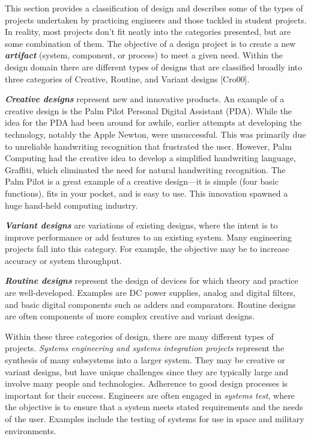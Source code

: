 This section provides a classification of design and describes some of
the types of projects undertaken by practicing engineers and those
tackled in student projects. In reality, most projects don't fit neatly
into the categories presented, but are some combination of them. The
objective of a design project is to create a new
\emph{\textbf{artifact}} (system, component, or process) to meet a given
need. Within the design domain there are different types of designs that
are classified broadly into three categories of Creative, Routine, and
Variant designs {[}Cro00{]}.

\emph{\textbf{Creative designs}} represent new and innovative products.
An example of a creative design is the Palm Pilot Personal Digital
Assistant (PDA). While the idea for the PDA had been around for awhile,
earlier attempts at developing the technology, notably the Apple Newton,
were unsuccessful. This was primarily due to unreliable handwriting
recognition that frustrated the user. However, Palm Computing had the
creative idea to develop a simplified handwriting language, Graffiti,
which eliminated the need for natural handwriting recognition. The Palm
Pilot is a great example of a creative design---it is simple (four basic
functions), fits in your pocket, and is easy to use. This innovation
spawned a huge hand-held computing industry.

\emph{\textbf{Variant designs}} are variations of existing designs,
where the intent is to improve performance or add features to an
existing system. Many engineering projects fall into this category. For
example, the objective may be to increase accuracy or system throughput.

\emph{\textbf{Routine designs}} represent the design of devices for
which theory and practice are well-developed. Examples are DC power
supplies, analog and digital filters, and basic digital components such
as adders and comparators. Routine designs are often components of more
complex creative and variant designs.

Within these three categories of design, there are many different types
of projects. \emph{Systems engineering and systems integration projects}
represent the synthesis of many subsystems into a larger system. They
may be creative or variant designs, but have unique challenges since
they are typically large and involve many people and technologies.
Adherence to good design processes is important for their success.
Engineers are often engaged in \emph{systems test}, where the objective
is to ensure that a system meets stated requirements and the needs of
the user. Examples include the testing of systems for use in space and
military environments.

